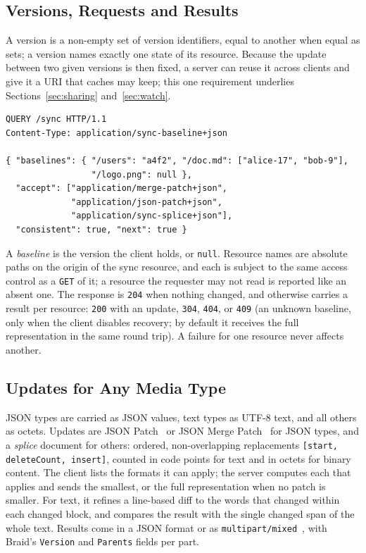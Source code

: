 \documentclass[11pt,a4paper]{article}
\begin{document}
\subsection{Versions, Requests and Results}

A version is a non-empty set of version identifiers, equal to another when equal as sets; a version names exactly one state of its resource. Because the update between two given versions is then fixed, a server can reuse it across clients and give it a URI that caches may keep; this one requirement underlies Sections~\ref{sec:sharing} and~\ref{sec:watch}.

\begin{lstlisting}[style=code]
QUERY /sync HTTP/1.1
Content-Type: application/sync-baseline+json

{ "baselines": { "/users": "a4f2", "/doc.md": ["alice-17", "bob-9"],
                 "/logo.png": null },
  "accept": ["application/merge-patch+json",
             "application/json-patch+json",
             "application/sync-splice+json"],
  "consistent": true, "next": true }
\end{lstlisting}

A \emph{baseline} is the version the client holds, or \texttt{null}. Resource names are absolute paths on the origin of the sync resource, and each is subject to the same access control as a \texttt{GET} of it; a resource the requester may not read is reported like an absent one. The response is \texttt{204} when nothing changed, and otherwise carries a result per resource: \texttt{200} with an update, \texttt{304}, \texttt{404}, or \texttt{409} (an unknown baseline, only when the client disables recovery; by default it receives the full representation in the same round trip). A failure for one resource never affects another.

\subsection{Updates for Any Media Type}

JSON types are carried as JSON values, text types as UTF-8 text, and all others as octets. Updates are JSON Patch~\cite{rfc6902} or JSON Merge Patch~\cite{rfc7396} for JSON types, and a \emph{splice} document for others: ordered, non-overlapping replacements \texttt{[start, deleteCount, insert]}, counted in code points for text and in octets for binary content. The client lists the formats it can apply; the server computes each that applies and sends the smallest, or the full representation when no patch is smaller. For text, it refines a line-based diff to the words that changed within each changed block, and compares the result with the single changed span of the whole text. Results come in a JSON format or as \texttt{multipart/mixed}~\cite{rfc2046}, with Braid's \texttt{Version} and \texttt{Parents} fields per part.
\end{document}
